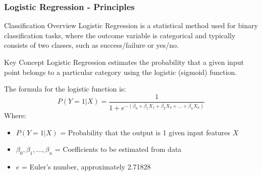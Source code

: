 \documentclass[aspectratio=169]{beamer}
\begin{document}
\begin{frame}[fragile]
    \frametitle{Logistic Regression - Principles}
    \begin{block}{Classification Overview}
        Logistic Regression is a statistical method used for binary classification tasks, where the outcome variable is categorical and typically consists of two classes, such as success/failure or yes/no.
    \end{block}
    
    \begin{block}{Key Concept}
        Logistic Regression estimates the probability that a given input point belongs to a particular category using the logistic (sigmoid) function.
    \end{block}

    The formula for the logistic function is:
    \begin{equation}
    P(Y=1|X) = \frac{1}{1 + e^{-(\beta_0 + \beta_1X_1 + \beta_2X_2 + ... + \beta_nX_n)}}
    \end{equation}
    Where:
    \begin{itemize}
        \item $P(Y=1|X)$ = Probability that the output is 1 given input features $X$
        \item $\beta_0, \beta_1, \ldots, \beta_n$ = Coefficients to be estimated from data
        \item $e$ = Euler's number, approximately 2.71828
    \end{itemize}
\end{frame}
\end{document}
